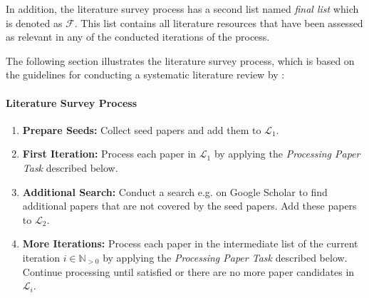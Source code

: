 In addition, the literature survey process has a second list named \emph{final list} which is denoted as $\mathcal{F}$. This list contains all literature resources that have been assessed as relevant in any of the conducted iterations of the process.

The following section illustrates the literature survey process, which is based on the guidelines for conducting a systematic literature review by \textcite{wohlin_guidelines_2014}:


\paragraph{Literature Survey Process}
\begin{enumerate}
    \item \textbf{Prepare Seeds:} Collect seed papers and add them to $\mathcal{L}_1$.
    \item \textbf{First Iteration:} Process each paper in $\mathcal{L}_1$ by applying the \emph{Processing Paper Task} described below.
    \item \textbf{Additional Search:} Conduct a search e.g. on Google Scholar to find additional papers that are not covered by the seed papers. Add these papers to $\mathcal{L}_2$.
    \item \textbf{More Iterations:} Process each paper in the intermediate list of the current iteration $i \in \mathbb{N}_{>0}$ by applying the \emph{Processing Paper Task} described below. Continue processing until satisfied or there are no more paper candidates in $\mathcal{L}_i$.
\end{enumerate}

